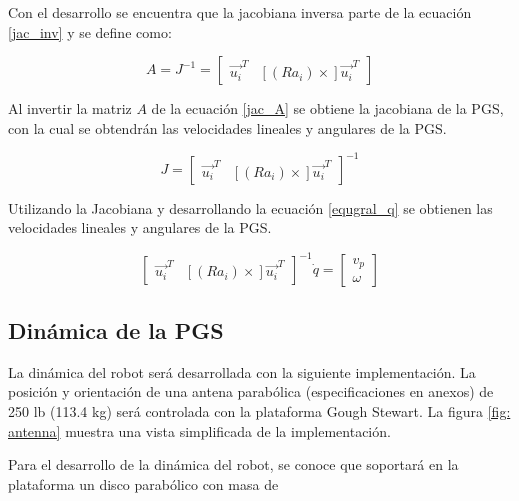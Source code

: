 Con el desarrollo se encuentra que la jacobiana inversa 
parte de la ecuación \ref{jac_inv} y se define como:

\begin{equation}\label{jac_A}
A = J^{-1} = \begin{bmatrix}
\vec{u_i}^T & [(Ra_i)\times]\vec{u_i}^T
\end{bmatrix}
\end{equation}

Al invertir la matriz $A$ de la ecuación \ref{jac_A} se 
obtiene la jacobiana de la PGS, con la cual se obtendrán las 
velocidades lineales y angulares de la PGS.

\begin{equation*}
J = \begin{bmatrix}
\vec{u_i}^T & [(Ra_i)\times]\vec{u_i}^T
\end{bmatrix}^{-1}
\end{equation*}

Utilizando la Jacobiana y desarrollando la ecuación 
\ref{equgral_q} se obtienen las velocidades lineales y 
angulares de la PGS.

\begin{equation*}
\begin{bmatrix}
\vec{u_i}^T & [(Ra_i)\times]\vec{u_i}^T
\end{bmatrix}^{-1} \dot{q} = \begin{bmatrix}
v_p\\
\omega
\end{bmatrix}
\end{equation*}

\subsection{Dinámica de la PGS}

La dinámica del robot será desarrollada
con la siguiente implementación. 
La posición y orientación de una
antena parabólica (especificaciones en anexos)
de 250 lb (113.4 kg) será controlada con la 
plataforma Gough Stewart. 
La figura \ref{fig: antenna} muestra una vista simplificada
de la implementación.

Para el desarrollo de la dinámica del robot, se conoce que 
soportará en la plataforma un disco parabólico con masa de 



